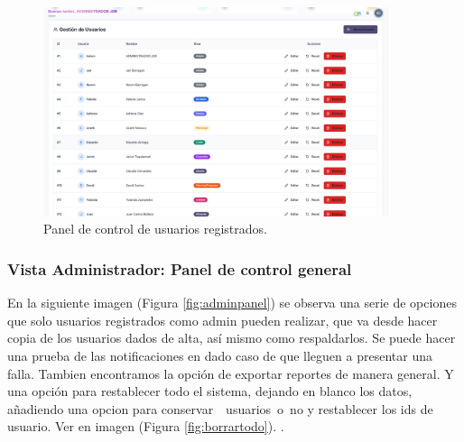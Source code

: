 \documentclass[12pt,letterpaper,spanish]{report}
\begin{document}
\begin{figure}[H]
    \centering
    \includegraphics[width=0.9\textwidth]{admin_usuarios.jpg}
    \caption{Panel de control de usuarios registrados.}
    \label{fig:usersadminscreen}
\end{figure}

\subsubsection{Vista Administrador: Panel de control general}
En la siguiente imagen (Figura \ref{fig:adminpanel}) se observa una serie de opciones que solo usuarios registrados como admin pueden realizar, que va desde hacer copia de los usuarios dados de alta, así mismo como respaldarlos.
Se puede hacer una prueba de las notificaciones en dado caso de que lleguen a presentar una falla.
Tambien encontramos la opción de exportar reportes de manera general.
Y una opción para restablecer todo el sistema, dejando en blanco los datos, añadiendo una opcion para conservar  usuarios o no y restablecer los ids de usuario. Ver en imagen (Figura \ref{fig:borrartodo}).   .
\end{document}

